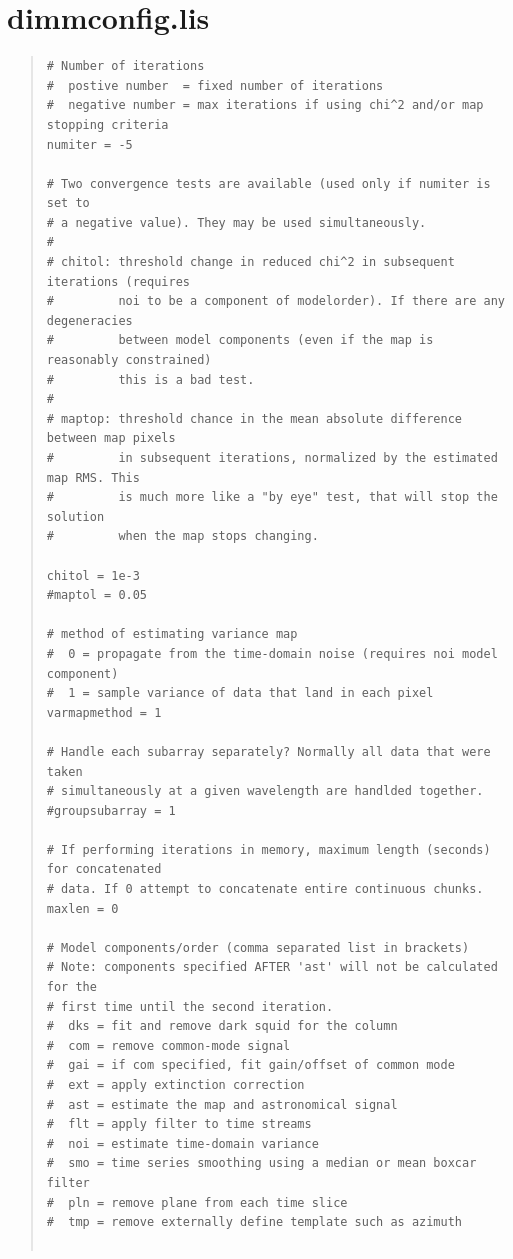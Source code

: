 \documentclass[twoside,11pt]{article}
\newcounter{box}
\newcommand{\xlabel}[1]{}
\renewcommand{\_}{\texttt{\symbol{95}}}
\newenvironment{myquote}{\begin{quote}\begin{small}}{\end{small}\end{quote}}
\begin{document}
\section{\xlabel{defconfig}dimmconfig.lis}
\label{app:dimm}
\begin{myquote}
\begin{verbatim}
# Number of iterations
#  postive number  = fixed number of iterations
#  negative number = max iterations if using chi^2 and/or map stopping criteria
numiter = -5

# Two convergence tests are available (used only if numiter is set to
# a negative value). They may be used simultaneously.
#
# chitol: threshold change in reduced chi^2 in subsequent iterations (requires
#         noi to be a component of modelorder). If there are any degeneracies
#         between model components (even if the map is reasonably constrained)
#         this is a bad test.
#
# maptop: threshold chance in the mean absolute difference between map pixels
#         in subsequent iterations, normalized by the estimated map RMS. This
#         is much more like a "by eye" test, that will stop the solution
#         when the map stops changing.

chitol = 1e-3
#maptol = 0.05

# method of estimating variance map
#  0 = propagate from the time-domain noise (requires noi model component)
#  1 = sample variance of data that land in each pixel
varmapmethod = 1

# Handle each subarray separately? Normally all data that were taken
# simultaneously at a given wavelength are handlded together.
#groupsubarray = 1

# If performing iterations in memory, maximum length (seconds) for concatenated
# data. If 0 attempt to concatenate entire continuous chunks.
maxlen = 0

# Model components/order (comma separated list in brackets)
# Note: components specified AFTER 'ast' will not be calculated for the
# first time until the second iteration.
#  dks = fit and remove dark squid for the column
#  com = remove common-mode signal
#  gai = if com specified, fit gain/offset of common mode
#  ext = apply extinction correction
#  ast = estimate the map and astronomical signal
#  flt = apply filter to time streams
#  noi = estimate time-domain variance
#  smo = time series smoothing using a median or mean boxcar filter
#  pln = remove plane from each time slice
#  tmp = remove externally define template such as azimuth


\end{verbatim}
\end{myquote}
\end{document}
